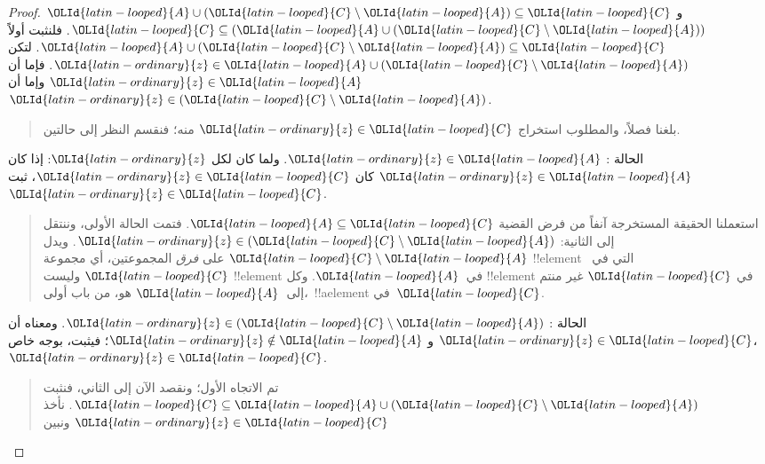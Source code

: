 \documentclass[../../../include/open-logic-section]{subfiles}
\begin{document}
\begin{proof}
  ${\OLId{latin-looped}{A}} \cup ({\OLId{latin-looped}{C}} \setminus {\OLId{latin-looped}{A}}) \subseteq {\OLId{latin-looped}{C}}$ و
  ${\OLId{latin-looped}{C}} \subseteq ({\OLId{latin-looped}{A}} \cup ({\OLId{latin-looped}{C}} \setminus {\OLId{latin-looped}{A}}))$. فلنثبت أولاً
  ${\OLId{latin-looped}{A}} \cup ({\OLId{latin-looped}{C}} \setminus {\OLId{latin-looped}{A}}) \subseteq {\OLId{latin-looped}{C}}$. لتكن
  ${\OLId{latin-ordinary}{z}} \in {\OLId{latin-looped}{A}} \cup ({\OLId{latin-looped}{C}} \setminus {\OLId{latin-looped}{A}})$. فإما أن ${\OLId{latin-ordinary}{z}} \in {\OLId{latin-looped}{A}}$ وإما أن
  ${\OLId{latin-ordinary}{z}} \in ({\OLId{latin-looped}{C}} \setminus {\OLId{latin-looped}{A}})$.
  \begin{quote}
    بلغنا فصلاً، والمطلوب استخراج ${\OLId{latin-ordinary}{z}} \in {\OLId{latin-looped}{C}}$ منه؛ فنقسم النظر إلى
    حالتين.
  \end{quote}
  الحالة : ${\OLId{latin-ordinary}{z}} \in {\OLId{latin-looped}{A}}$. ولما كان لكل ${\OLId{latin-ordinary}{z}}$: إذا كان ${\OLId{latin-ordinary}{z}} \in {\OLId{latin-looped}{A}}$ كان
  ${\OLId{latin-ordinary}{z}} \in {\OLId{latin-looped}{C}}$، ثبت ${\OLId{latin-ordinary}{z}} \in {\OLId{latin-looped}{C}}$.
  \begin{quote}
    استعملنا الحقيقة المستخرجة آنفاً من فرض القضية
    ${\OLId{latin-looped}{A}} \subseteq {\OLId{latin-looped}{C}}$. فتمت الحالة الأولى، وننتقل إلى الثانية:
    ${\OLId{latin-ordinary}{z}} \in ({\OLId{latin-looped}{C}} \setminus {\OLId{latin-looped}{A}})$. ويدل ${\OLId{latin-looped}{C}} \setminus {\OLId{latin-looped}{A}}$ على \emph{فرق}
    المجموعتين، أي مجموعة !!{element} التي في~${\OLId{latin-looped}{C}}$ وليست
    !!{element} في~${\OLId{latin-looped}{A}}$. وكل !!{element} في ${\OLId{latin-looped}{C}}$ غير منتم إلى~${\OLId{latin-looped}{A}}$ هو،
    من باب أولى،~!!a{element} في~${\OLId{latin-looped}{C}}$.
  \end{quote}
  الحالة : ${\OLId{latin-ordinary}{z}} \in ({\OLId{latin-looped}{C}} \setminus {\OLId{latin-looped}{A}})$. ومعناه أن ${\OLId{latin-ordinary}{z}} \in {\OLId{latin-looped}{C}}$ و
  ${\OLId{latin-ordinary}{z}} \notin {\OLId{latin-looped}{A}}$؛ فيثبت، بوجه خاص،~${\OLId{latin-ordinary}{z}} \in {\OLId{latin-looped}{C}}$.
  \begin{quote}
    تم الاتجاه الأول؛ ونقصد الآن إلى الثاني، فنثبت
    ${\OLId{latin-looped}{C}} \subseteq {\OLId{latin-looped}{A}} \cup ({\OLId{latin-looped}{C}} \setminus {\OLId{latin-looped}{A}})$. نأخذ ${\OLId{latin-ordinary}{z}} \in {\OLId{latin-looped}{C}}$ ونبين

\end{quote}
\end{proof}
\end{document}
